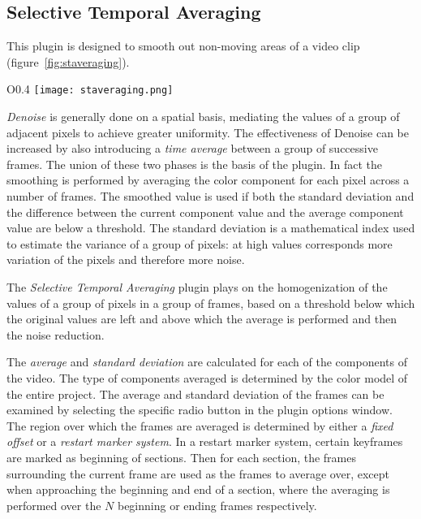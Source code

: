 \subsection{Selective Temporal Averaging}%
\label{sub:selective_temporal_averaging}

This plugin is designed to smooth out non-moving areas of a video clip (figure~\ref{fig:staveraging}).
\vspace{2ex}
\begin{wrapfigure}[18]{O}{0.4\linewidth}
   \vspace{-2ex}
    \texttt{[image: staveraging.png]}
    \caption{STA control window}
    \label{fig:staveraging}
\end{wrapfigure}

\textit{Denoise} is generally done on a spatial basis, mediating the values of a group of adjacent pixels to achieve greater uniformity. The effectiveness of Denoise can be increased by also introducing a \textit{time average} between a group of successive frames. The union of these two phases is the basis of the plugin. In fact the smoothing is performed by averaging the color component for each pixel across a number of frames. The smoothed value is used if both the standard deviation and the difference between the current component value and the average component value are below a threshold. The standard deviation is a mathematical index used to estimate the variance of a group of pixels: at high values corresponds more variation of the pixels and therefore more noise.

The \textit{Selective Temporal Averaging} plugin plays on the homogenization of the values of a group of pixels in a group of frames, based on a threshold below which the original values are left and above which the average is performed and then the noise reduction.

The \textit{average} and \textit{standard deviation} are calculated for each of the components of the video. The type of components averaged is determined by the color model of the entire project. The average and standard deviation of the frames can be examined by selecting the specific radio button in the plugin options window.
The region over which the frames are averaged is determined by either a \textit{fixed offset} or a \textit{restart marker system}. In a restart marker system, certain keyframes are marked as beginning of sections. Then for each section, the frames surrounding the current frame are used as the frames to average over, except when approaching the beginning and end of a section, where the averaging is performed over the $N$ beginning or ending frames respectively.


